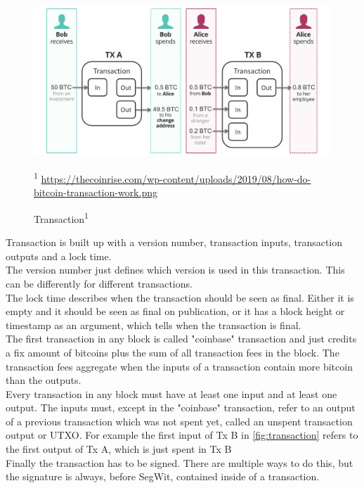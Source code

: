 \begin{figure}[!ht]
    \centering
    \includegraphics[width=\textwidth]{Ausarbeitung/images/transaction.png} \caption[Transaction]{Transaction\textsuperscript{1}} \small\textsuperscript{1} \url{https://thecoinrise.com/wp-content/uploads/2019/08/how-do-bitcoin-transaction-work.png}
    \label{fig:transaction}
\end{figure}
Transaction is built up with a version number, transaction inputs, transaction outputs and a lock time. \\
The version number just defines which version is used in this transaction. This can be differently for different transactions. \\
The lock time describes when the transaction should be seen as final. Either it is empty and it should be seen as final on publication, or it has a block height or timestamp as an argument, which tells when the transaction is final. \\
The first transaction in any block is called "coinbase" transaction and just credits a fix amount of bitcoins plus the sum of all transaction fees in the block. The transaction fees aggregate when the inputs of a transaction contain more bitcoin than the outputs. \\
Every transaction in any block must have at least one input and at least one output. The inputs must, except in the "coinbase" transaction, refer to an output of a previous transaction which was not spent yet, called an unspent transaction output or UTXO. For example the first input of Tx B in \autoref{fig:transaction} refers to the first output of Tx A, which is just spent in Tx B \\
Finally the transaction has to be signed. There are multiple ways to do this, but the signature is always, before SegWit, contained inside of a transaction.


